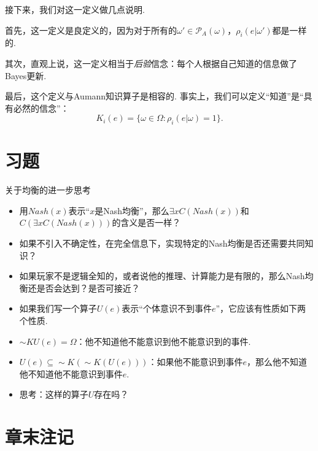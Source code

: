 接下来，我们对这一定义做几点说明. 

首先，这一定义是良定义的，因为对于所有的$\omega'\in\mathcal P_A(\omega)$，$\rho_i(e|\omega')$都是一样的.

其次，直观上说，这一定义相当于\emph{后验}信念：每个人根据自己知道的信息做了Bayes更新.

最后，这个定义与Aumann知识算子是相容的. 事实上，我们可以定义“知道”是“具有必然的信念”：
\[K_i(e)=\{\omega\in\Omega:\rho_i(e|\omega) = 1\}.\]

\section{习题}

    {关于均衡的进一步思考}
\begin{itemize}
    \item 用$Nash(x)$表示“$x$是Nash均衡”，那么$\exists x C(Nash(x))$和$C(\exists x C(Nash(x)))$的含义是否一样？
    \item 如果不引入不确定性，在完全信息下，实现特定的Nash均衡是否还需要共同知识？
    \item 如果玩家不是逻辑全知的，或者说他的推理、计算能力是有限的，那么Nash均衡还是否会达到？是否可接近？
\end{itemize}

\begin{itemize}
    \item 如果我们写一个算子$U(e)$表示“个体意识不到事件$e$”，它应该有性质如下两个性质. 
    \item $\sim KU(e)=\Omega$：他不知道他不能意识到他不能意识到的事件.
    \item $U(e)\subseteq \sim K(\sim K(U(e)))$：如果他不能意识到事件$e$，那么他不知道他不知道他不能意识到事件$e$.
    \item 思考：这样的算子$U$存在吗？
\end{itemize}

\section{章末注记}